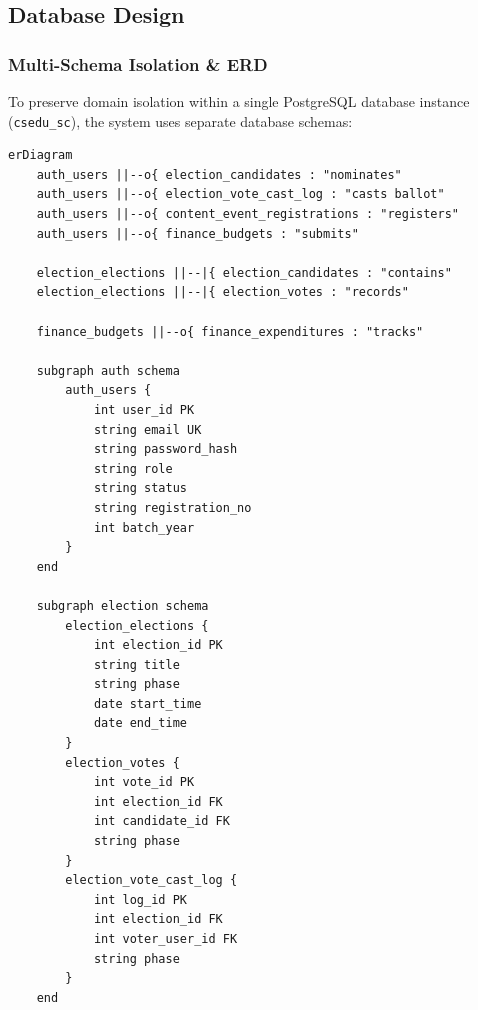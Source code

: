\documentclass[12pt, a4paper]{article}
\begin{document}
\subsection{Database Design}

\subsubsection{Multi-Schema Isolation \& ERD}
To preserve domain isolation within a single PostgreSQL database instance (\texttt{csedu\_sc}), the system uses separate database schemas:

\begin{lstlisting}[language=mermaid, caption={Database Relational Entity Diagram across Schemas}]
erDiagram
    auth_users ||--o{ election_candidates : "nominates"
    auth_users ||--o{ election_vote_cast_log : "casts ballot"
    auth_users ||--o{ content_event_registrations : "registers"
    auth_users ||--o{ finance_budgets : "submits"
    
    election_elections ||--|{ election_candidates : "contains"
    election_elections ||--|{ election_votes : "records"
    
    finance_budgets ||--o{ finance_expenditures : "tracks"
    
    subgraph auth schema
        auth_users {
            int user_id PK
            string email UK
            string password_hash
            string role
            string status
            string registration_no
            int batch_year
        }
    end
    
    subgraph election schema
        election_elections {
            int election_id PK
            string title
            string phase
            date start_time
            date end_time
        }
        election_votes {
            int vote_id PK
            int election_id FK
            int candidate_id FK
            string phase
        }
        election_vote_cast_log {
            int log_id PK
            int election_id FK
            int voter_user_id FK
            string phase
        }
    end
\end{lstlisting}
\end{document}
